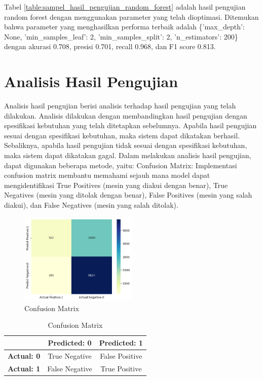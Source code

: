 Tabel \ref{table:sampel_hasil_pengujian_random_forest} adalah hasil pengujian random forest dengan menggunakan parameter yang telah dioptimasi. Ditemukan bahwa parameter yang menghasilkan performa terbaik adalah \{'max\_depth': None, 'min\_samples\_leaf': 2, 'min\_samples\_split': 2, 'n\_estimators': 200\} dengan akurasi 0.708, presisi 0.701, recall 0.968, dan F1 score 0.813.

\section{Analisis Hasil Pengujian}
Analisis hasil pengujian berisi analisis terhadap hasil pengujian yang telah dilakukan. Analisis dilakukan dengan membandingkan hasil pengujian dengan spesifikasi kebutuhan yang telah ditetapkan sebelumnya. Apabila hasil pengujian sesuai dengan spesifikasi kebutuhan, maka sistem dapat dikatakan berhasil. Sebaliknya, apabila hasil pengujian tidak sesuai dengan spesifikasi kebutuhan, maka sistem dapat dikatakan gagal.
Dalam melakukan analisis hasil pengujian, dapat digunakan beberapa metode, yaitu:
Confusion Matrix: Implementasi confusion matrix membantu memahami sejauh mana model dapat mengidentifikasi True Positives (mesin yang diakui dengan benar), True Negatives (mesin yang ditolak dengan benar), False Positives (mesin yang salah diakui), dan False Negatives (mesin yang salah ditolak).

\begin{figure}
    \centering
    \includegraphics[width=0.5\textwidth]{contents/chapter-6/confusion_matrix.png}
    \caption{Confusion Matrix}
    \label{fig:confusion_matrix}
\end{figure}

\begin{table}[H]
    \centering
    \begin{tabular}{|c|c|c|}
    \hline
     & \textbf{Predicted: 0} & \textbf{Predicted: 1} \\
    \hline
    \textbf{Actual: 0} & True Negative & False Positive \\
    \hline
    \textbf{Actual: 1} & False Negative & True Positive \\
    \hline
    \end{tabular}
    \caption{Confusion Matrix}
    \label{table:1}
\end{table}

